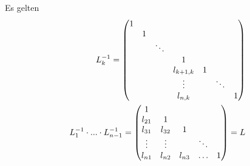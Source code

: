 \begin{proposition}
	Es gelten
	\begin{align}
		L_k^{-1} = 
		\begin{pmatrix}
			1 &  &  &  &  &  &  \\
			& 1 &  &  &  &  &  \\
			&  & \ddots &  &  &  &  \\
			&  &  & 1 &  &  &   \\
			&  &  & l_{k+1,k} & 1 &  &  \\
			&  &  & \vdots &  & \ddots &  \\
			&  &  & l_{n,k} &  &  & 1  \\
		\end{pmatrix} \notag \\
		L_1^{-1}\cdot ...\cdot L_{n-1}^{-1} = 
		\begin{pmatrix}
			1 & & & & \\
			l_{21} & 1 & & & \\
			l_{31} & l_{32} & 1 & & \\
			\vdots & \vdots & & \ddots & \\
			l_{n1} & l_{n2} & l_{n3} & \dots & 1 \\
		\end{pmatrix}= L \notag
	\end{align}
\end{proposition}
